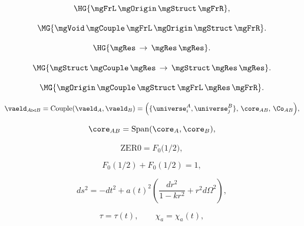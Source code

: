 \[
\HG{\mgFrL\,\mgOrigin\,\mgStruct\,\mgFrR},
\]

\[
\MG{\mgVoid\,\mgCouple\,\mgFrL\,\mgOrigin\,\mgStruct\,\mgFrR}.
\]

\[
\HG{\mgRes\,\rightarrow\,\mgRes\,\mgRes}.
\]

\[
\MG{\mgStruct\,\mgCouple\,\mgRes\,\rightarrow\,\mgStruct\,\mgRes\,\mgRes}.
\]

\[
\MG{\mgOrigin\,\mgCouple\,\mgStruct\,\mgFrL\,\mgRes\,\mgFrR}.
\]

\[
\vaeld_{A \bowtie B}
=
\operatorname{Couple}(\vaeld_A,\vaeld_B)
=
\Big( \{\universe_i^A,\universe_j^B\},\, \core_{AB},\, \Co_{AB} \Big),
\]

\[
\core_{AB} = \operatorname{Span}(\core_A,\core_B),
\]

\[
\mathrm{ZER0} = F_0\big(1/2\big),
\]

\[
F_0(1/2) + F_0(1/2) = 1,
\]

\[
ds^2 = -dt^2 + a(t)^2 \left( \frac{dr^2}{1-kr^2} + r^2 d\Omega^2 \right),
\]

\[
\tau = \tau(t), \qquad \chi_a = \chi_a(t),
\]


